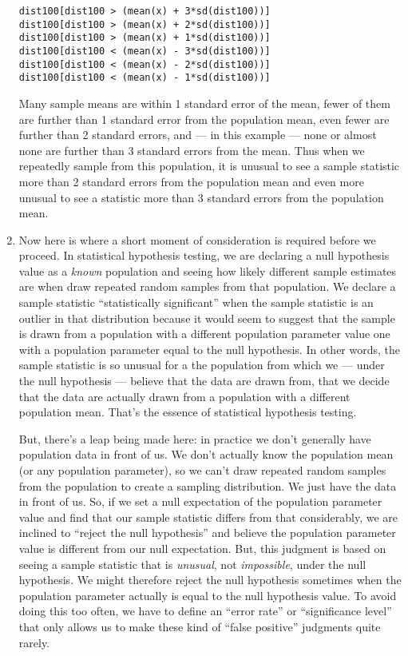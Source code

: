 \documentclass[a4paper,12pt]{article}
\begin{document}
\begin{enumerate}
\begin{verbatim}
dist100[dist100 > (mean(x) + 3*sd(dist100))]
dist100[dist100 > (mean(x) + 2*sd(dist100))]
dist100[dist100 > (mean(x) + 1*sd(dist100))]
dist100[dist100 < (mean(x) - 3*sd(dist100))]
dist100[dist100 < (mean(x) - 2*sd(dist100))]
dist100[dist100 < (mean(x) - 1*sd(dist100))]
\end{verbatim}

\noindent Many sample means are within 1 standard error of the mean, fewer of them are further than 1 standard error from the population mean, even fewer are further than 2 standard errors, and --- in this example --- none or almost none are further than 3 standard errors from the mean. Thus when we repeatedly sample from this population, it is unusual to see a sample statistic more than 2 standard errors from the population mean and even more unusual to see a statistic more than 3 standard errors from the population mean.

\item Now here is where a short moment of consideration is required before we proceed. In statistical hypothesis testing, we are declaring a null hypothesis value as a \textit{known} population and seeing how likely different sample estimates are when draw repeated random samples from that population. We declare a sample statistic ``statistically significant'' when the sample statistic is an outlier in that distribution because it would seem to suggest that the sample is drawn from a population with a different population parameter value one with a population parameter equal to the null hypothesis. In other words, the sample statistic is so unusual for a the population from which we --- under the null hypothesis --- believe that the data are drawn from, that we decide that the data are actually drawn from a population with a different population mean. That's the essence of statistical hypothesis testing.

But, there's a leap being made here: in practice we don't generally have population data in front of us. We don't actually know the population mean (or any population parameter), so we can't draw repeated random samples from the population to create a sampling distribution. We just have the data in front of us. So, if we set a null expectation of the population parameter value and find that our sample statistic differs from that considerably, we are inclined to ``reject the null hypothesis'' and believe the population parameter value is different from our null expectation. But, this judgment is based on seeing a sample statistic that is \textit{unusual}, not \textit{impossible}, under the null hypothesis. We might therefore reject the null hypothesis sometimes when the population parameter actually is equal to the null hypothesis value. To avoid doing this too often, we have to define an ``error rate'' or ``significance level'' that only allows us to make these kind of ``false positive'' judgments quite rarely.


\end{enumerate}
\end{document}
